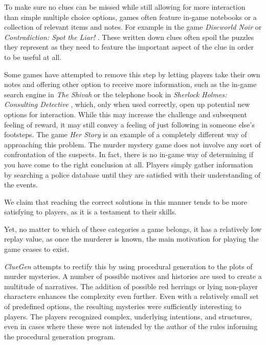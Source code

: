 To make sure no clues can be missed while still allowing for more interaction than simple multiple choice options, games often feature in-game notebooks or a collection of relevant items and notes.
For example in the game \emph{Discworld Noir} \cite{game:discworld_noir} or \emph{Contradiction: Spot the Liar!} \cite{game:contradiction}.
These written down clues often spoil the puzzles they represent as they need to feature the important aspect of the clue in order to be useful at all.

Some games have attempted to remove this step by letting players take their own notes and offering other option to receive more information, such as the in-game search engine in \emph{The Shivah} \cite{game:shivah} or the telephone book in \emph{Sherlock Holmes: Consulting Detective} \cite{game:sherlock}, which, only when used correctly, open up potential new options for interaction.
While this may increase the challenge and subsequent feeling of reward, it may still convey a feeling of just following in someone else's footsteps.
The game \emph{Her Story} \cite{game:her_story} is an example of a completely different way of approaching this problem.
The murder mystery game does not involve any sort of confrontation of the suspects.
In fact, there is no in-game way of determining if you have come to the right conclusion at all.
Players simply gather information by searching a police database until they are satisfied with their understanding of the events.

We claim that reaching the correct solutions in this manner tends to be more satisfying to players, as it is a testament to their skills.

Yet, no matter to which of these categories a game belongs, it has a relatively low replay value, as once the murderer is known, the main motivation for playing the game ceases to exist.

\emph{ClueGen} \cite{stockdale_2016} attempts to rectify this by using procedural generation to the plots of murder mysteries.
A number of possible motives and histories are used to create a multitude of narratives.
The addition of possible red herrings or lying non-player characters enhances the complexity even further.
Even with a relatively small set of predefined options, the resulting mysteries were sufficiently interesting to players.
The players recognized complex, underlying intentions, and structures, even in cases where these were not intended by the author of the rules informing the procedural generation program.

